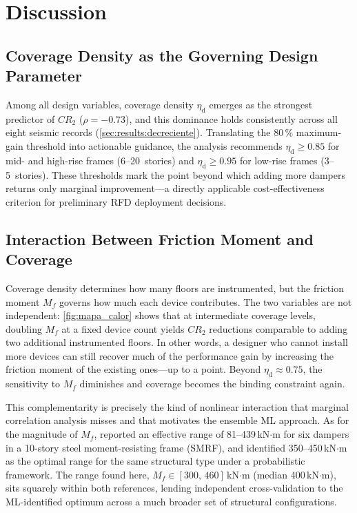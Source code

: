 \documentclass[preprint,12pt,authoryear]{elsarticle}
\newcommand{\etad}{\eta_{\mathrm{d}}}
\newcommand{\Mf}{M_{\!f}}
\begin{document}
\section{Discussion}
\label{sec:discussion}

\subsection{Coverage Density as the Governing Design Parameter}

Among all design variables, coverage density $\etad$ emerges as the strongest
predictor of $CR_2$ ($\rho = -0.73$), and this dominance holds consistently
across all eight seismic records (\cref{sec:results:decreciente}). Translating
the 80\,\% maximum-gain threshold into actionable guidance, the analysis
recommends $\etad \geq 0.85$ for mid- and high-rise frames (6--20~stories)
and $\etad \geq 0.95$ for low-rise frames (3--5~stories). These thresholds
mark the point beyond which adding more dampers returns only marginal
improvement---a directly applicable cost-effectiveness criterion for
preliminary RFD deployment decisions.

\subsection{Interaction Between Friction Moment and Coverage}

Coverage density determines how many floors are instrumented, but the friction
moment $\Mf$ governs how much each device contributes. The two variables are
not independent: \cref{fig:mapa_calor} shows that at intermediate coverage
levels, doubling $\Mf$ at a fixed device count yields $CR_2$ reductions
comparable to adding two additional instrumented floors. In other words, a
designer who cannot install more devices can still recover much of the
performance gain by increasing the friction moment of the existing ones---up
to a point. Beyond $\etad \approx 0.75$, the sensitivity to $\Mf$ diminishes
and coverage becomes the binding constraint again.

This complementarity is precisely the kind of nonlinear interaction that
marginal correlation analysis misses and that motivates the ensemble ML
approach. As for the magnitude of $\Mf$, \citet{Jarrahi2020sdee} reported
an effective range of 81--439\,kN$\cdot$m for six dampers in a 10-story
steel moment-resisting frame (SMRF), and \citet{Ponce2026} identified
350--450\,kN$\cdot$m as the optimal range for the same structural type under
a probabilistic framework. The range found here, $\Mf \in [300,\,460]$\,kN$\cdot$m
(median 400\,kN$\cdot$m), sits squarely within both references, lending
independent cross-validation to the ML-identified optimum across a much
broader set of structural configurations.
\end{document}
